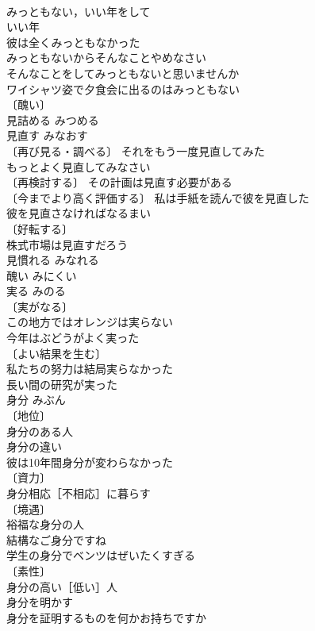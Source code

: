 \documentclass[8pt]{extreport}
\begin{document}
\begin{CJK}{UTF8}{min}
\\	みっともない，いい年をして 
\\	いい年　
\\	彼は全くみっともなかった 
\\	みっともないからそんなことやめなさい 
\\	そんなことをしてみっともないと思いませんか 
\\	ワイシャツ姿で夕食会に出るのはみっともない 
\\	〔醜い〕
\\	見詰める	みつめる	
\\	見直す	みなおす	
\\	〔再び見る・調べる〕 それをもう一度見直してみた 
\\	もっとよく見直してみなさい 
\\	〔再検討する〕 その計画は見直す必要がある 
\\	〔今までより高く評価する〕 私は手紙を読んで彼を見直した 
\\	彼を見直さなければなるまい 
\\	〔好転する〕
\\	株式市場は見直すだろう 
\\	見慣れる	みなれる	
\\	醜い	みにくい	
\\	実る	みのる	
\\	〔実がなる〕
\\	この地方ではオレンジは実らない 
\\	今年はぶどうがよく実った 
\\	〔よい結果を生む〕
\\	私たちの努力は結局実らなかった 
\\	長い間の研究が実った 
\\	身分	みぶん	
\\	〔地位〕
\\	身分のある人 
\\	身分の違い 
\\	彼は10年間身分が変わらなかった 
\\	〔資力〕
\\	身分相応［不相応］に暮らす 
\\	〔境遇〕
\\	裕福な身分の人 
\\	結構なご身分ですね 
\\	学生の身分でベンツはぜいたくすぎる 
\\	〔素性〕
\\	身分の高い［低い］人 
\\	身分を明かす 
\\	身分を証明するものを何かお持ちですか 

\end{CJK}
\end{document}
